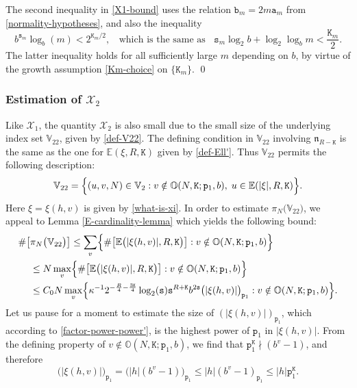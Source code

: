 \documentclass[12pt, twoside]{article}
\theoremstyle{definition}
\numberwithin{equation}{section}
\begin{document}
The second inequality in \eqref{X1-bound} uses the relation $\mathtt b_m = 2m \mathtt a_m$ from \eqref{normality-hypotheses}, and also the inequality 
\[ b^{\mathtt s_m} \log_b(m) < 2^{\mathtt K_m/2}, \; \; \text{ which is the same as } \; \; \mathtt s_m \log_2 b + \log_2 \log_b m < \frac{\mathtt K_m}{2}.  \]  The latter inequality holds for all sufficiently large $m$ depending on $b$, by virtue of the growth assumption \eqref{Km-choice} on $\{\mathtt K_m\}$.
\qed 
\subsubsection{Estimation of $\mathcal X_2$} \label{X2-estimation-section} 
Like $\mathcal X_1$, the quantity $\mathcal X_2$ is also small due to the small size of the underlying index set $\mathbb V_{22}$, given by \eqref{def-V22}. The defining condition in $\mathbb V_{22}$ involving $\mathfrak n_{R-\mathtt K}$ is the same as the one for $\mathbb E(\xi, {R, \mathtt K})$ given by \eqref{def-Ell'}. Thus $\mathbb V_{22}$ permits the following description:  
\[ \mathbb V_{22} = \Bigl\{(u, v, N) \in \mathbb V_2: v \notin \mathbb O(N, \mathtt K; \mathtt p_1, b), \; u \in \mathbb E({|\xi|, R, \mathtt K}) \Bigr\}. \] 
Here $\xi = \xi(h, v)$ is given by \eqref{what-is-xi}. In order to estimate $\pi_N \bigl(\mathbb V_{22}\bigr)$, we appeal to Lemma \ref{E-cardinality-lemma} which yields the following bound:
\begin{align} 
\# \bigl[ &\pi_N \bigl( \mathbb V_{22} \bigr) \bigr]  
\leq \sum_{v} \Bigl\{ \# \bigl[ \mathbb E\bigl(|\xi(h,v)|, R, \mathtt K\bigr)\bigr] : v \notin \mathbb O(N, \mathtt K; \mathtt p_1, b) \Bigr\} \nonumber \\
&\leq N \max_{v} \Bigl\{\# \bigl[ \mathbb E\bigl(|\xi(h,v)|, R, \mathtt K \bigr)\bigr] :  v \notin \mathbb O(N, \mathtt K; \mathtt p_1, b) \Bigr\} \nonumber \\ 
&\leq C_0 N \max_v \Bigl\{\kappa^{-1} 2^{-\frac{R}{4} - \frac{3\mathtt K}{4}} \log_2(\mathtt s) \mathtt s^{R + \mathtt K} b^{2\mathtt s} \bigl(|\xi(h,v)|\bigr)_{\mathtt p_1} :  v \notin \mathbb O(N, \mathtt K; \mathtt p_1, b)  \Bigr\}. \label{V22-card-step0}
\end{align}
Let us pause for a moment to estimate the size of $(|\xi(h,v)|)_{\mathtt p_1}$, which according to \eqref{factor-power-power'}, is the highest power of $\mathtt p_1$ in $|\xi(h,v)|$. From the defining property of $v \notin \mathbb O(N, \mathtt K; \mathtt p_1, b)$, we find that $\mathtt p_1^{\mathtt K} \nmid (b^v-1)$, and therefore 
\[ \bigl( |\xi(h,v)| \bigr)_{\mathtt p_1} = \bigl({|h|} (b^v-1) \bigr)_{\mathtt p_1} \leq {|h|} (b^v-1)_{\mathtt p_1} \leq {|h|} \mathtt p_1^{\mathtt K}.  \]
\end{document}
